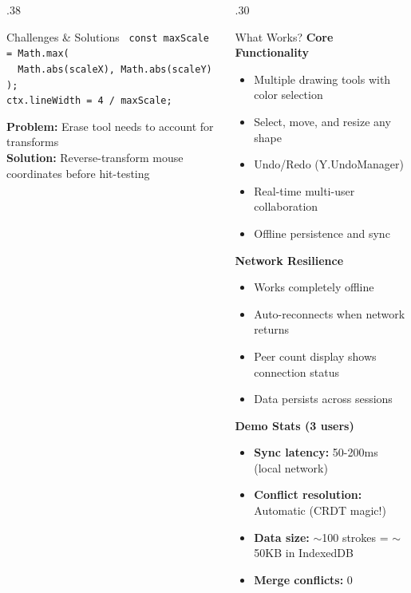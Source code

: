 \documentclass[final,t]{beamer}
\begin{document}
\begin{frame}[t]
\begin{columns}[t]
\begin{column}{.38\linewidth}
\begin{block}{Challenges \& Solutions}
{{\vspace{0.2cm}
\texttt{\small
const maxScale = Math.max(\\
~~Math.abs(scaleX), Math.abs(scaleY)\\);\\
ctx.lineWidth = 4 / maxScale;
}
}
}

\vspace{0.5cm}
\colorbox{blue!10}{
\parbox{0.95\linewidth}{
\textbf{Problem:} Erase tool needs to account for transforms\\
\textbf{Solution:} Reverse-transform mouse coordinates before hit-testing
}
}
\end{block}

\end{column}

\begin{column}{.30\linewidth}

\begin{block}{What Works?}
\textbf{Core Functionality}
\begin{itemize}
    \item Multiple drawing tools with color selection
    \item Select, move, and resize any shape
    \item Undo/Redo (Y.UndoManager)
    \item Real-time multi-user collaboration
    \item Offline persistence and sync
\end{itemize}

\vspace{0.3cm}
\textbf{Network Resilience}
\begin{itemize}
    \item Works completely offline
    \item Auto-reconnects when network returns
    \item Peer count display shows connection status
    \item Data persists across sessions
\end{itemize}

\vspace{0.3cm}
\textbf{Demo Stats (3 users)}
\begin{itemize}
    \item \textbf{Sync latency:} 50-200ms (local network)
    \item \textbf{Conflict resolution:} Automatic (CRDT magic!)
    \item \textbf{Data size:} $\sim$100 strokes = $\sim$50KB in IndexedDB
    \item \textbf{Merge conflicts:} 0
\end{itemize}
\end{block}


\end{column}
\end{columns}
\end{frame}
\end{document}
